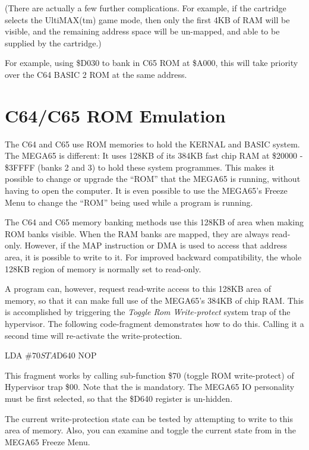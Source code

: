 (There are actually a few further complications. For example, if the
cartridge selects the UltiMAX(tm) game mode, then only the first 4KB
of RAM will be visible, and the remaining address space will be
un-mapped, and able to be supplied by the cartridge.)

For example, using \$D030 to bank in C65
ROM at \$A000, this will take priority over the C64 BASIC 2 ROM at the
same address.

\section{C64/C65 ROM Emulation}

The C64 and C65 use ROM memories to hold the KERNAL and BASIC system.
The MEGA65 is different: It uses 128KB of its 384KB fast chip RAM at
\$20000 - \$3FFFF (banks 2 and 3) to
hold these system programmes. This makes it possible to change or upgrade the
``ROM'' that the MEGA65 is running, without having to open the
computer. It is even possible to use the MEGA65's Freeze Menu to
change the ``ROM'' being used while a program is running.

The C64 and C65 memory banking methods use this 128KB of area when
making ROM banks visible.  When the RAM banks are mapped, they are
always read-only.  However, if the MAP instruction or DMA is used to
access that address area, it is possible to write to it. For improved
backward compatibility, the whole 128KB region of memory is normally
set to read-only.

A program can, however, request read-write access to this
128KB area of memory, so that it can make full use of the MEGA65's
384KB of chip RAM.  This is accomplished by triggering the {\em Toggle
  Rom Write-protect} system trap of the hypervisor.  The following
code-fragment demonstrates how to do this. Calling it a second time
will re-activate the write-protection.

\begin{screenoutput}
  LDA #$70
  STA $D640
  NOP
\end{screenoutput}

This fragment works by
calling sub-function \$70 (toggle ROM write-protect) of Hypervisor
trap \$00. Note that the  is mandatory. The MEGA65
IO personality must be first selected, so that the \$D640 register is
un-hidden.

The current write-protection
state can be tested by attempting to write to this area of memory.
Also, you can examine and toggle the current state from in the MEGA65
Freeze Menu.

